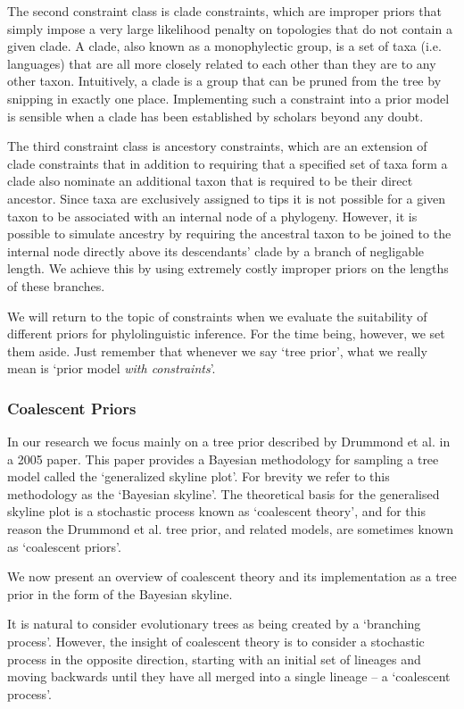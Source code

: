 \documentclass[10pt,journal,compsoc]{IEEEtran}
\begin{document}
The second constraint class is clade constraints, which are improper priors that simply impose a very large likelihood penalty on topologies that do not contain a given clade. A clade, also known as a monophylectic group, is a set of taxa (i.e. languages) that are all more closely related to each other than they are to any other taxon. Intuitively, a clade is a group that can be pruned from the tree by snipping in exactly one place. Implementing such a constraint into a prior model is sensible when a clade has been established by scholars beyond any doubt.

The third constraint class is ancestory constraints, which are an extension of clade constraints that in addition to requiring that a specified set of taxa form a clade also nominate an additional taxon that is required to be their direct ancestor. Since taxa are exclusively assigned to tips it is not possible for a given taxon to be associated with an internal node of a phylogeny. However, it is possible to simulate ancestry by requiring the ancestral taxon to be joined to the internal node directly above its descendants' clade by a branch of negligable length. We achieve this by using extremely costly improper priors on the lengths of these branches.

We will return to the topic of constraints when we evaluate the suitability of different priors for phylolinguistic inference. For the time being, however, we set them aside. Just remember that whenever we say `tree prior', what we really mean is `prior model \textit{with constraints}'.

\subsubsection{Coalescent Priors}

In our research we focus mainly on a tree prior described by Drummond et al. in a 2005 paper. This paper provides a Bayesian methodology for sampling a tree model called the `generalized skyline plot'. For brevity we refer to this methodology as the `Bayesian skyline'. The theoretical basis for the generalised skyline plot is a stochastic process known as `coalescent theory', and for this reason the Drummond et al. tree prior, and related models, are sometimes known as `coalescent priors'.

We now present an overview of coalescent theory and its implementation as a tree prior in the form of the Bayesian skyline.

It is natural to consider evolutionary trees as being created by a `branching process'. However, the insight of coalescent theory is to consider a stochastic process in the opposite direction, starting with an initial set of lineages and moving backwards until they have all merged into a single lineage -- a `coalescent process'.
\end{document}
